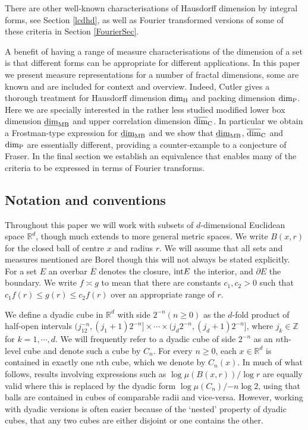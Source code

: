 \documentclass[12pt]{article}
\newcommand{\1}{{\bf 1}}
\newcommand\ucod{\overline{\mbox{\rm dim}}_{\rm C}} %
\newcommand\pkd{\mbox{\rm dim}_{\rm P}} %
\newcommand\hdd{\mbox{\rm dim}_{\rm H}} %
\newcommand\mlbd{\underline{\mbox{\rm dim}}_{\rm MB}} %
\newcommand{\R}{\mathbb{R}}
\begin{document}
There are other well-known characterisations of Hausdorff dimension by integral forms, see Section \ref{lcdhd}, as well as Fourier transformed versions of some of these criteria in Section \ref{FourierSec}.

A benefit of having a range of measure characterisations of the dimension of a set is that different forms can be appropriate for different applications.  In this paper we present measure representations for a number of fractal dimensions, some are known and are included for context and overview. Indeed, Cutler \cite{Cu} gives a thorough treatment for Hausdorff dimension $\hdd$ and packing dimension $\pkd$. Here we are specially interested in the rather less studied modified lower box dimension $\mlbd$ and upper correlation dimension $\ucod$. In particular we obtain a Frostman-type expression for $\mlbd$ and we show that $\mlbd$, $\ucod$ and $\pkd$ are essentially different, providing a counter-example to a conjecture of Fraser. In the final section we establish an equivalence that enables many of the criteria to be expressed in terms of Fourier transforms.

\subsection{Notation and conventions}
Throughout this paper we will work with subsets of $d$-dimensional Euclidean space $\R^d$, though much extends to more general metric spaces. We write $B(x,r)$ for the closed ball of centre $x$ and radius $r$.  We will assume that all sets and measures mentioned are Borel though this will not always be stated explicitly.  For a set $E$ an overbar $\overline{E}$ denotes the closure, ${\rm int}E$ the interior, and $\partial E$ the boundary. We write $f\asymp g$ to mean that there are constants $c_1,c_2 >0$ such that 
$c_1 f(r) \leq g(r) \leq c_2 f(r)$ over an appropriate range of $r$.

We define a dyadic cube in $\R^d$ with side $2^{-n} (n\geq0)$  as the $d$-fold product of half-open intervals $(j_12^{-n},(j_1+1)2^{-n}]\times\cdots\times(j_d2^{-n},(j_d+1)2^{-n}]$, where $j_k\in\mathbb{Z}$ for  $k=1,\cdots,d$.
	We will frequently refer to a dyadic cube of side $2^{-n}$   as an $n$th-level cube  and denote such a cube by $C_n$. For every $n\geq0$, each $x\in\R^d$ is contained in exactly one $n$th cube, which we denote  by $C_n(x)$. In much of what follows, results involving expressions such as ${\log  \mu(B(x,r))}/{ \log r}$ are equally valid where this is replaced by the dyadic form ${\log  \mu(C_n)}/{ -n\log 2}$, using that balls are contained in cubes of comparable radii and vice-versa.  However, working with  dyadic versions is often easier because of the `nested' property of dyadic cubes, that any two cubes are either disjoint or one contains the other.
\end{document}
